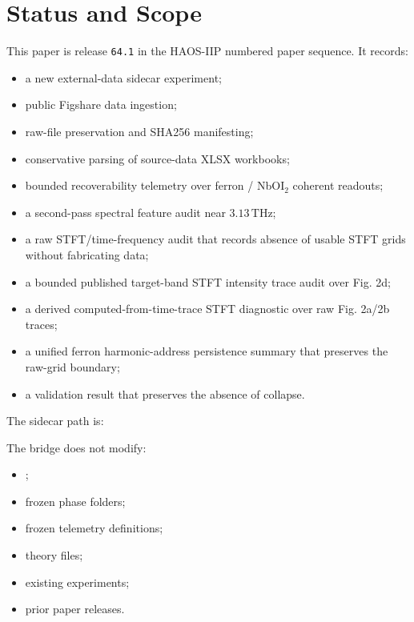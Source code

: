 \documentclass[11pt]{article}
\begin{document}
\tableofcontents

\section{Status and Scope}

This paper is release \texttt{64.1} in the HAOS-IIP numbered paper sequence.
It records:

\begin{itemize}
\item a new external-data sidecar experiment;
\item public Figshare data ingestion;
\item raw-file preservation and SHA256 manifesting;
\item conservative parsing of source-data XLSX workbooks;
\item bounded recoverability telemetry over ferron / NbOI$_2$ coherent readouts;
\item a second-pass spectral feature audit near \(3.13\,\mathrm{THz}\);
\item a raw STFT/time-frequency audit that records absence of usable STFT grids without fabricating data;
\item a bounded published target-band STFT intensity trace audit over Fig. 2d;
\item a derived computed-from-time-trace STFT diagnostic over raw Fig. 2a/2b traces;
\item a unified ferron harmonic-address persistence summary that preserves the raw-grid boundary;
\item a validation result that preserves the absence of collapse.
\end{itemize}

The sidecar path is:

\begin{quote}
\end{quote}

The bridge does not modify:

\begin{itemize}
\item {};
\item frozen phase folders;
\item frozen telemetry definitions;
\item theory files;
\item existing experiments;
\item prior paper releases.
\end{itemize}
\end{document}
